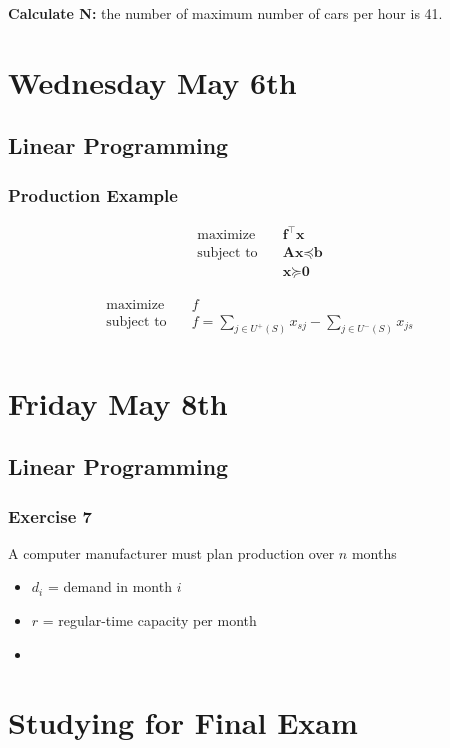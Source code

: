 \documentclass[11pt]{article}
\begin{document}
\textbf{Calculate N:} the number of maximum number of cars per hour is 41.

\section{Wednesday May 6th}
\subsection{Linear Programming}
\subsubsection{Production Example}

\begin{align}
  \text{maximize} & \quad \textbf{f}^\top \textbf{x} \\
  \text{subject to} & \quad \textbf{A} \textbf{x} \preceq \textbf{b} \\
  & \quad \textbf{x} \succeq \textbf{0}
\end{align}

\begin{align}
  \text{maximize} & \quad f \\
  \text{subject to} & \quad f = \sum_{j\in U^{+}(S)} x_{sj} - \sum_{j\in U^{-}(S)} x_{js}\\
  & \quad 
\end{align}

\section{Friday May 8th}
\subsection{Linear Programming}
\subsubsection{Exercise 7}
A computer manufacturer must plan production over $n$ months
\begin{itemize}
    \item $d_i$ = demand in month $i$
    \item $r$ = regular-time capacity per month
    \item 
\end{itemize}

\section{Studying for Final Exam}
\end{document}
